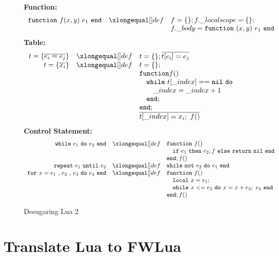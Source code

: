 \begin{figure}
\caption{Desugaring Lua 2}\label{fig:desLua2}
{\bf Function:}\[
\begin{array}{rclcl}
\desugar{{\tt function}~f(x,y)~e_1~{\tt end}}{f = \{\}; f.\_localscope = \{\};}
\desugarline{f.\_body = {\tt function}~(x,y)~e_1~{\tt end}}
\end{array}\]
{\bf Table:}\[
\begin{array}{rclcl}
\desugar{t = \{\overline{e_i = e_j}\}}{t = \{\}; \overline{t[e_i]=e_j}}
\desugar{t = \{\overline{x_i}\}}{t = \{\};}
\desugarline{ {\tt function} f()\\ 
   \quad {\tt while}~t[\_index] == {\tt nil~do}\\
   \quad\quad \_index = \_index + 1~ \\
   \quad{\tt end};\\
   {\tt end};\\
   \overline{t[\_index] = x_i;~f()}\\
 }
\end{array}\]
{\bf Control Statement:}\[
\begin{array}{rclcl}
\desugar{{\tt while}~e_1~{\tt do}~e_2~{\tt end}}{
    {\tt function}~f()
}
\desugarline{ \quad{\tt if}~e_1~{\tt then}~e_2;f~{\tt else}~{\tt return}~{\tt nil}~{\tt end}\\
{\tt end};f()
}
\desugar{{\tt repeat}~e_1~{\tt until}~e_2}{
   {\tt while}~{\tt not}~e_2~{\tt do}~e_1~{\tt end}\\
}
\desugar{{\tt for}~x=e_1~{\tt ,}~e_2~{\tt ,}~e_3~{\tt do}~e_4~{\tt end}}{
    {\tt function}~f()
}
\desugarline{
    \quad {\tt local}~x = e_1;\\
    \quad {\tt while}~x<= e_2~{\tt do}~x = x + e_3;~e_4~{\tt end}\\
    {\tt end};f()\\
}
\end{array}\]
\end{figure}


\section{Translate Lua to FWLua}

